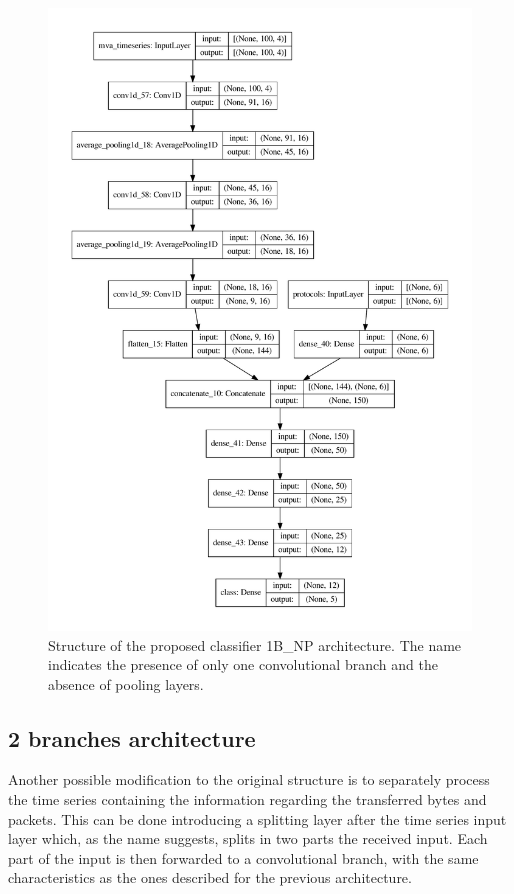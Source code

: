 \begin{figure}
    \centering
\includegraphics[height=0.95\textheight]{images/models/model_1bnp.pdf}
\caption{{Structure of the proposed classifier 1B\_NP architecture. The name indicates the presence of only one convolutional branch and the absence of pooling layers.}}    \label{fig:1bnp_model}
\end{figure}

\subsection{2 branches architecture}\label{2bmodels}

Another possible modification to the original structure is to separately process the time series containing the information regarding the transferred bytes and packets. This can be done introducing a splitting layer after the time series input layer which, as the name suggests, splits in two parts the received input. Each part of the input is then forwarded to a convolutional branch, with the same characteristics as the ones described for the previous architecture.

